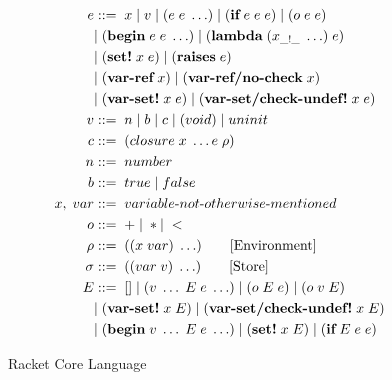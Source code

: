 \documentclass[sigplan,screen,anonymous]{acmart}
\def\dash {\text{-}}
\begin{document}
\begin{figure}[tbp]
  \begin{align*}
    e &::=\; x\; |\; v\; |\; (e\; e\; \ldots)\; |\; (\textbf{if}\; e\; e\; e)\; |\; (o\; e\; e)\; \\
    \; &|\; (\textbf{begin}\; e\; e\; \ldots)\; |\; (\textbf{lambda}\; (x_{\_!\_}\; \ldots)\; e)\\
    \; &|\; (\textbf{set!}\; x\; e)\; |\; (\textbf{raises}\; e)\\
    \; &|\; (\textbf{var\dash ref}\; x)\; |\; (\textbf{var\dash ref/no\dash check}\; x) \\
    \; &|\; (\textbf{var\dash set!}\; x\; e)\; |\; (\textbf{var\dash set/check\dash undef!}\; x\; e) \\
    v   &::=\; n\; |\; b\; |\; c\; |\; (void)\; |\; uninit \\ %
    c   &::=\; (closure\; x\; \ldots e\; \rho) \\
    n   &::=\; number \\
    b   &::=\; true\; |\; false \\
    x,\; var &::=\; variable\dash not\dash otherwise\dash mentioned \\ %
    o  &::=\; +\; |\; * |\; < \\
    \rho   &::=\; ((x\; var)\; \ldots) \tag*{[Environment]}\\
    \sigma   &::=\; ((var\; v)\; \ldots) \tag*{[Store]}\\
    E   &::=\; []\; |\; (v\; \ldots\; E\; e\; \ldots)\; |\; (o\; E\; e)\; |\; (o\; v\; E) \\
    \;  &|\; (\textbf{var\dash set!}\; x\; E)\; |\; (\textbf{var\dash set/check\dash undef!}\; x\; E) \\
    \;  &|\; (\textbf{begin}\; v\; \ldots\; E\; e\; \ldots)\; |\; (\textbf{set!}\; x\; E)\; |\; (\textbf{if}\; E\; e\; e)
  \end{align*}
  \caption{Racket Core Language}
  \label{fig:racket-source}
\end{figure}

\def\la {\bm{L_\alpha}}
\def\lb {\bm{L_\beta}}
\def\lc {\bm{L_\gamma}}


\end{document}
